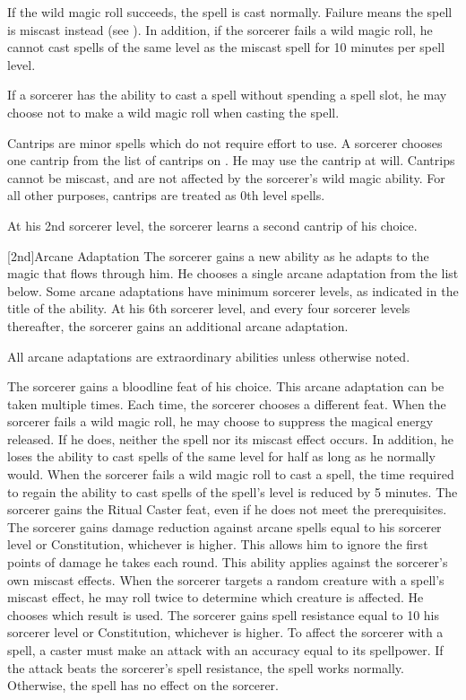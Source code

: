 If the wild magic roll succeeds, the spell is cast normally.
Failure means the spell is miscast instead (see ).
In addition, if the sorcerer fails a wild magic roll, he cannot cast spells of the same level as the miscast spell for 10 minutes per spell level.

If a sorcerer has the ability to cast a spell without spending a spell slot, he may choose not to make a wild magic roll when casting the spell.

Cantrips are minor spells which do not require effort to use.
A sorcerer chooses one cantrip from the list of cantrips on .
He may use the cantrip at will.
Cantrips cannot be miscast, and are not affected by the sorcerer's wild magic ability.
For all other purposes, cantrips are treated as 0th level spells.

At his 2nd sorcerer level, the sorcerer learns a second cantrip of his choice.

[2nd]{Arcane Adaptation}
The sorcerer gains a new ability as he adapts to the magic that flows through him.
He chooses a single arcane adaptation from the list below.
Some arcane adaptations have minimum sorcerer levels, as indicated in the title of the ability.
At his 6th sorcerer level, and every four sorcerer levels thereafter, the sorcerer gains an additional arcane adaptation.

All arcane adaptations are extraordinary abilities unless otherwise noted.

The sorcerer gains a bloodline feat of his choice.
This arcane adaptation can be taken multiple times.
Each time, the sorcerer chooses a different feat.
When the sorcerer fails a wild magic roll, he may choose to suppress the magical energy released.
If he does, neither the spell nor its miscast effect occurs.
In addition, he loses the ability to cast spells of the same level for half as long as he normally would.
When the sorcerer fails a wild magic roll to cast a spell, the time required to regain the ability to cast spells of the spell's level is reduced by 5 minutes.
The sorcerer gains the Ritual Caster feat, even if he does not meet the prerequisites.
The sorcerer gains damage reduction against arcane spells equal to his sorcerer level or Constitution, whichever is higher.
This allows him to ignore the first points of damage he takes each round.
This ability applies against the sorcerer's own miscast effects.
When the sorcerer targets a random creature with a spell's miscast effect, he may roll twice to determine which creature is affected.
He chooses which result is used.
The sorcerer gains spell resistance equal to 10 \add his sorcerer level or Constitution, whichever is higher.
To affect the sorcerer with a spell, a caster must make an attack with an accuracy equal to its spellpower.
If the attack beats the sorcerer's spell resistance, the spell works normally.
Otherwise, the spell has no effect on the sorcerer.

